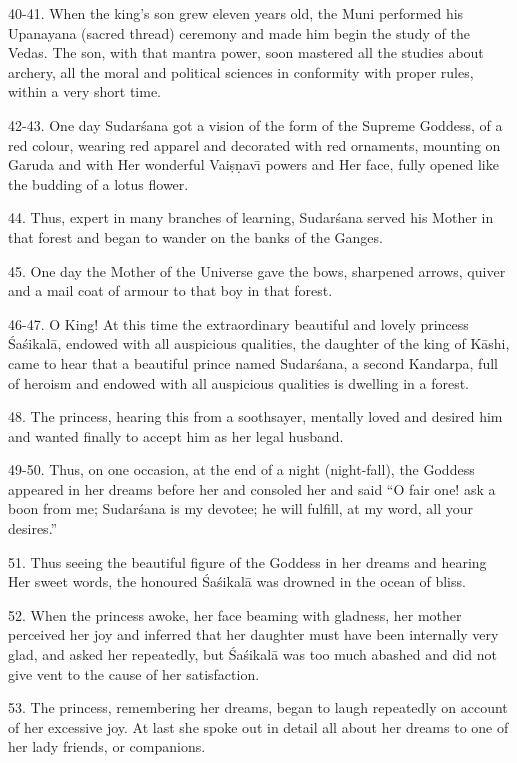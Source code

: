 40-41. When the king's son grew eleven years old, the Muni performed his Upanayana (sacred thread) ceremony and made him begin the study of the Vedas. The son, with that mantra power, soon mastered all the studies about archery, all the moral and political sciences in conformity with proper rules, within a very short time.

42-43. One day Sudar\'sana got a vision of the form of the Supreme Goddess, of a red colour, wearing red apparel and decorated with red ornaments, mounting on Garuda and with Her wonderful Vai\d{s}\d{n}av\={\i} powers and Her face, fully opened like the budding of a lotus flower.

44. Thus, expert in many branches of learning, Sudar\'sana served his Mother in that forest and began to wander on the banks of the Ganges.

45. One day the Mother of the Universe gave the bows, sharpened arrows, quiver and a mail coat of armour to that boy in that forest.

46-47. O King! At this time the extraordinary beautiful and lovely princess \'Sa\'sikal\=a, endowed with all auspicious qualities, the daughter of the king of K\=ashi, came to hear that a beautiful prince named Sudar\'sana, a second Kandarpa, full of heroism and endowed with all auspicious qualities is dwelling in a forest.

48. The princess, hearing this from a soothsayer, mentally loved and desired him and wanted finally to accept him as her legal husband.

49-50. Thus, on one occasion, at the end of a night (night-fall), the Goddess appeared in her dreams before her and consoled her and said ``O fair one! ask a boon from me; Sudar\'sana is my devotee; he will fulfill, at my word, all your desires.''

51. Thus seeing the beautiful figure of the Goddess in her dreams and hearing Her sweet words, the honoured \'Sa\'sikal\=a was drowned in the ocean of bliss.

52. When the princess awoke, her face beaming with gladness, her mother perceived her joy and inferred that her daughter must have been internally very glad, and asked her repeatedly, but \'Sa\'sikal\=a was too much abashed and did not give vent to the cause of her satisfaction.

53. The princess, remembering her dreams, began to laugh repeatedly on account of her excessive joy. At last she spoke out in detail all about her dreams to one of her lady friends, or companions.

